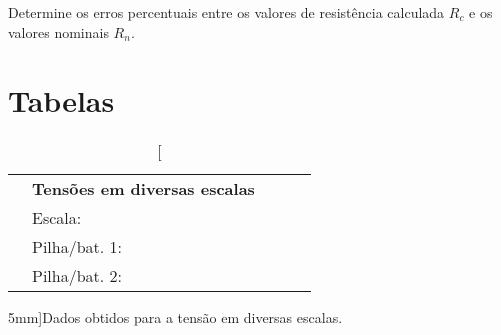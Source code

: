\begin{question}[type={exam}]{2.5}
Determine os erros percentuais entre os valores de resistência calculada $R_c$ e os valores nominais $R_n$. 
\end{question}

\vfill
\pagebreak
\section{Tabelas}

\begin{table*}[!ht]
\centering
\begin{tabular}{lp{20mm}p{20mm}p{20mm}p{20mm}p{20mm}p{20mm}p{20mm}l}
\toprule
    & \multicolumn{5}{l}{\textbf{Tensões em diversas escalas}} \\
    \cmidrule{2-8}
    & Escala: \cellcolor[gray]{0.89} & \cellcolor[gray]{0.92} & \cellcolor[gray]{0.89} & \cellcolor[gray]{0.92} & \cellcolor[gray]{0.89} & \cellcolor[gray]{0.92} & \cellcolor[gray]{0.89} & \\
    & Pilha/bat. 1: \cellcolor[gray]{0.95} & \cellcolor[gray]{0.97} & \cellcolor[gray]{0.95} & \cellcolor[gray]{0.97} & \cellcolor[gray]{0.95} & \cellcolor[gray]{0.97} &  \cellcolor[gray]{0.95} \\
    & Pilha/bat. 2: \cellcolor[gray]{0.89} & \cellcolor[gray]{0.92} & \cellcolor[gray]{0.89} & \cellcolor[gray]{0.92} & \cellcolor[gray]{0.89} & \cellcolor[gray]{0.92} & \cellcolor[gray]{0.89} \\
\bottomrule
\end{tabular}
\caption[][5mm]{Dados obtidos para a tensão em diversas escalas.}
\label{Tab:TensaoPilha}
\end{table*}

\vspace{3cm}


